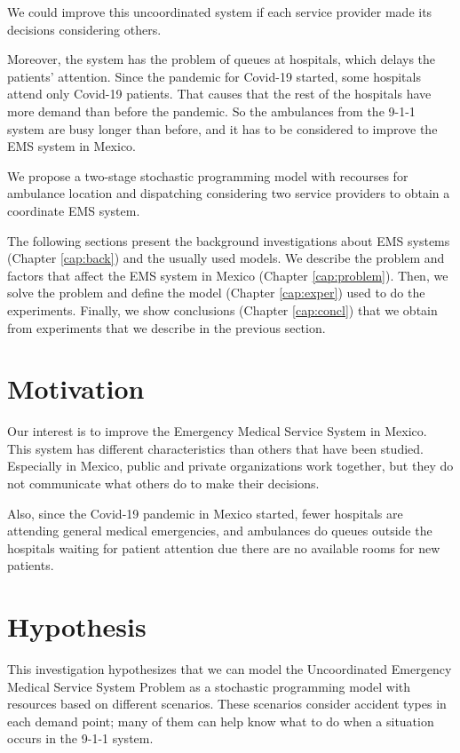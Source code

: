 We could improve this uncoordinated system if each service provider made its decisions considering others. 

Moreover, the system has the problem of queues at hospitals, which delays the patients' attention. Since the pandemic for Covid-19 started, some hospitals attend only Covid-19 patients. That causes that the rest of the hospitals have more demand than before the pandemic. So the ambulances from the 9-1-1 system are busy longer than before, and it has to be considered to improve the EMS system in Mexico.

We propose a two-stage stochastic programming model with recourses for ambulance location and dispatching considering two service providers to obtain a coordinate EMS system. 

The following sections present the background investigations about EMS sys\-tems (Chapter \ref{cap:back}) and the usually used models. We describe the problem and factors that affect the EMS system in Mexico (Chapter \ref{cap:problem}). Then, we solve the problem and define the model (Chapter \ref{cap:exper}) used to do the experiments. Finally, we show conclusions (Chapter \ref{cap:concl}) that we obtain from experiments that we describe in the previous section.

\section{Motivation}
Our interest is to improve the Emergency Medical Service System in Mexico. This system has different characteristics than others that have been studied. Especially in Mexico, public and private organizations work together, but they do not communicate what others do to make their decisions. 

Also, since the Covid-19 pandemic in Mexico started, fewer hospitals are attending general medical emergencies, and ambulances do queues outside the hos\-pi\-tals waiting for patient attention due there are no available rooms for new patients. 

\section{Hypothesis}
This investigation hypothesizes that we can model the Uncoordinated Emergency Medical Service System Problem as a stochastic programming model with resources based on different scenarios. These scenarios consider accident types in each demand point; many of them can help know what to do when a situation occurs in the 9-1-1 system.

